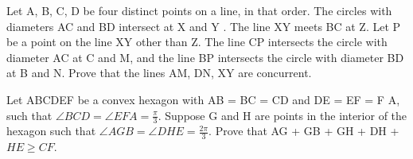 \item Let A, B, C, D be four distinct points on a line, in that order. The circles with diameters AC and BD intersect at X and Y . The line XY meets BC at Z. Let P be a point on the line XY other than Z. The line CP intersects the circle with diameter AC at C and M, and the line BP intersects the circle with diameter BD at B and N. Prove that the lines AM, DN, XY are concurrent.\\

\item Let ABCDEF be a convex hexagon with AB = BC = CD and DE = EF = F A, such that $\angle BCD = \angle EFA = \frac{\pi}{3}$. Suppose G and H are points in the interior of the hexagon such that $\angle AGB = \angle DHE = \frac{2\pi}{3}$. Prove that AG + GB + GH + DH + $HE \geq CF$.


